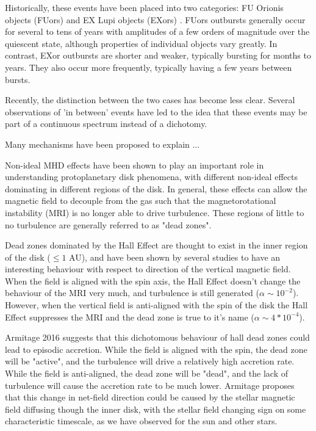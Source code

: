 Historically, these events have been placed into two categories: FU Orionis objects (FUors) and EX Lupi objects (EXors) \citep{herbig89}.  FUors outbursts generally occur for several to tens of years with amplitudes of a few orders of magnitude over the quiescent state, although properties of individual objects vary greatly.  In contrast, EXor outbursts are shorter and weaker, typically bursting for months to years.  They also occur more frequently, typically having a few years between bursts.   

Recently, the distinction between the two cases has become less clear.  Several observations of 'in between' events have led to the idea that these events may be part of a continuous spectrum instead of a dichotomy. 

Many mechanisms have been proposed to explain ...

Non-ideal MHD effects have been shown to play an important role in understanding protoplanetary disk phenomena, with different non-ideal effects dominating in different regions of the disk.  In general, these effects can allow the magnetic field to decouple from the gas such that the magnetorotational instability (MRI) is no longer able to drive turbulence.  These regions of little to no turbulence are generally referred to as "dead zones".  

Dead zones dominated by the Hall Effect are thought to exist in the inner region of the disk ($\leq 1$ AU), and have been shown by several studies to have an interesting behaviour with respect to direction of the vertical magnetic field.  When the field is aligned with the spin axis, the Hall Effect doesn't change the behaviour of the MRI very much, and turbulence is still generated ($\alpha \sim 10^{-2}$).  However, when the vertical field is anti-aligned with the spin of the disk the Hall Effect suppresses the MRI and the dead zone is true to it's name ($\alpha \sim 4*10^{-4}$).

Armitage 2016 suggests that this dichotomous behaviour of hall dead zones could lead to episodic accretion.  While the field is aligned with the spin, the dead zone will be "active", and the turbulence will drive a relatively high accretion rate.  While the field is anti-aligned, the dead zone will be "dead", and the lack of turbulence will cause the accretion rate to be much lower.  Armitage proposes that this change in net-field direction could be caused by the stellar magnetic field diffusing though the inner disk, with the stellar field changing sign on some characteristic timescale, as we have observed for the sun and other stars.  

